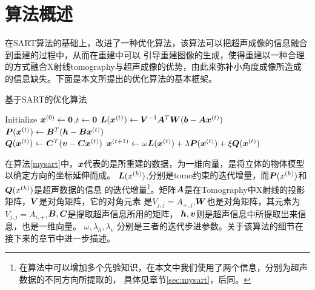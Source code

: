 \section{算法概述}
在SART算法的基础上，改进了一种优化算法，该算法可以把超声成像的信息融合到重建的过程中，从而在重建中可以
引导重建图像的生成，使得重建以一种合理的方式融合X射线tomography与超声成像的优势，由此来弥补小角度成像所造成
的信息缺失。下面是本文所提出的优化算法的基本框架。
\begin{algo}\label{mysart}
基于SART的优化算法
\begin{algorithmic}[1]
\STATE
Initialize $\bm{ x}^{(0)} \leftarrow \bm{0}$,$t\leftarrow \bm{0}$
\REPEAT
\STATE
$\bm{L}(\bm{ x}^{(t)}) \leftarrow  \bm{V}^{-1}\bm{A}^T\bm{W}(\bm{b}-\bm{A}\bm{ x}^{(t)})$ \\
$\bm{P}(\bm{ x}^{(t)}) \leftarrow \bm{B}^{T}(\bm{h}-\bm{B}\bm{ x}^{(t)})$ \\    %
$\bm{Q}(\bm{ x}^{(t)}) \leftarrow \bm{C}^{T}(\bm{v}-\bm{C}\bm{ x}^{(t)})$         %
\STATE
$\bm{ x}^{(t+1)}\leftarrow \omega\bm{L}(\bm{ x}^{(t)}) + \lambda\bm{P}(\bm{ x}^{(t)}) + \xi\bm{Q}(\bm{ x}^{(t)})    $
\end{algorithmic}
\end{algo}

在算法\ref{mysart}中，$\bm{ x}$代表的是所重建的数据，为一维向量，是将立体的物体模型以确定方向的坐标延伸而成。
$\bm{L}(x^{(k)})$,分别是tomo约束的迭代增量，而$\bm{P}(x^{(k)})$和$ \bm{Q}(x^{(k)})$是超声数据的信息
的迭代增量\footnote{在算法中可以增加多个先验知识，在本文中我们使用了两个信息，分别为超声数据的不同方向所提取的，
具体见章节\ref{sec:mysart}，后同。}。矩阵$\bm{A}$是在Tomography中X射线的投影矩阵，$\bm{V}$是对角矩阵，它的对角元素
是$V_{j,j}=A_{+,j}$,$\bm{W}$也是对角矩阵，其元素为$V_{j,j}=A_{i,+}$,$\bm{B},\bm{C}$是提取超声信息所用的矩阵，
$\bm{h},\bm{v}$则是超声信息中所提取出来信息，也是一维向量。
$\omega,\lambda_h,\lambda_v$
分别是三者的迭代步进参数。关于该算法的细节在接下来的章节中进一步描述。



